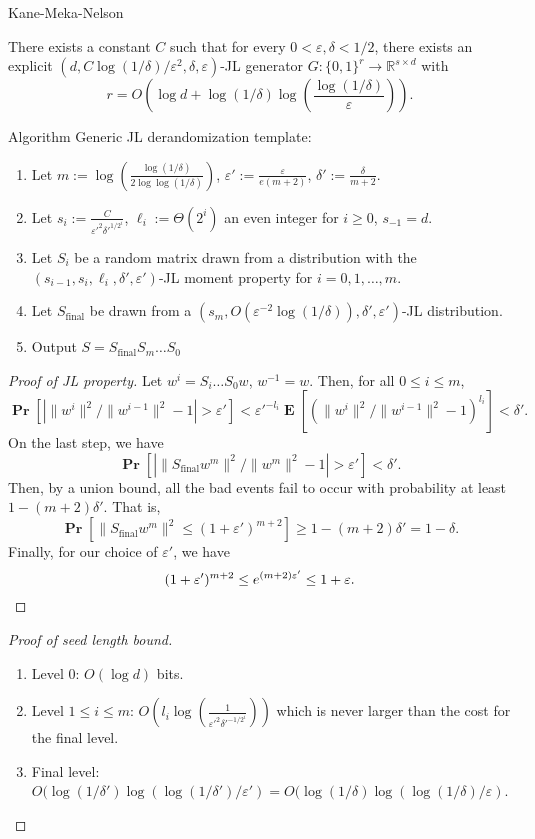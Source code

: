 \documentclass[10pt]{beamer}
\newcommand{\R}{\mathbb{R}}
\renewcommand{\P}{\operatorname*{\mathbf{Pr}}}
\newcommand{\E}{\operatorname*{\mathbf{E}}}
\renewcommand{\l}{\left}
\renewcommand{\r}{\right}
\newcommand{\eps}{\varepsilon}
\renewcommand{\d}{\displaystyle}
\begin{document}
\begin{frame}[allowframebreaks]{Kane-Meka-Nelson}
  \begin{theorem}
    \label{thm:main}
    There exists a constant $C$ such that for every
    $0<\eps,\delta<1/2$, there exists an explicit
    $(d,C\log(1/\delta)/\eps^2,\delta,\eps)$-JL generator
    $G:\{0,1\}^r\to \R^{s\times d}$ with
    \[
    r=O \l(\log d + \log(1/\delta)\log
    \l(\frac{\log(1/\delta)}{\eps}\r)\r).
    \]
  \end{theorem}

  \begin{block}{Algorithm}
    Generic JL derandomization template:
    \begin{enumerate}
    \item Let $m:=\d\log
      \l(\frac{\log(1/\delta)}{2\log\log(1/\delta)}\r)$,
      $\eps':=\d\frac{\eps}{e(m+2)}$, $\delta':=\d\frac{\delta}{m+2}$.
    \item Let $s_i:=\d\frac{C}{\eps'^2\delta'^{1/2^i}}$,
      $\ell_i:=\Theta(2^i)$ an even integer for $i\geq0$, $s_{-1}=d$.
    \item Let $S_i$ be a random matrix drawn from a distribution with
      the $(s_{i-1},s_i,\ell_i,\delta',\eps')$-JL moment property for
      $i=0,1,\ldots,m$.
    \item Let $S_{\text{final}}$ be drawn from a $\l(s_m, O
      \l(\eps^{-2}\log(1/\delta)\r),\delta',\eps'\r)$-JL distribution.
    \item Output $S=S_{\text{final}}S_m\ldots S_0$
    \end{enumerate}
  \end{block}

  \begin{proof}[Proof of JL property]
    Let $w^i=S_i\ldots S_0w$, $w^{-1}=w$. Then, for all $0\leq i \leq
    m$,
    \[
    \P\l[| \|w^i\|^2/\|w^{i-1}\|^2-1|>\eps'\r] <
    \eps'^{-l_i}\E\l[(\|w^i\|^2/\|w^{i-1}\|^2-1)^{l_i}\r]<\delta'.
    \]
    On the last step, we have
    \[
    \P\l[|\|S_{\text{final}}w^m\|^2/\|w^m\|^2-1| > \eps'\r]<\delta'.
    \]
    Then, by a union bound, all the bad events fail to occur with
    probability at least $1-(m+2)\delta'$. That is,
    \[
    \P\l[\|S_{\text{final}}w^m\|^2 \leq (1+\eps')^{m+2}\r] \geq 1-
    (m+2)\delta'=1-\delta.
    \]
    Finally, for our choice of $\eps'$, we have
    \[
    (1+\eps')^{m+2}\leq e^{(m+2)\eps'}\leq 1+\eps. \qedhere
    \]
  \end{proof}

  \begin{proof}[Proof of seed length bound]
    \begin{enumerate}
    \item Level $0$: $O(\log d)$ bits.
    \item Level $1\leq i \leq m$: $O(l_i\log
      \l(\frac{1}{\eps'^2\delta'^{-1/2^i}}\r))$ which is never
      larger than the cost for the final level.
    \item Final level: $O(\log(1/\delta')\log(\log(1/\delta')/\eps')
      = O(\log(1/\delta)\log(\log(1/\delta)/\eps)$.
    \end{enumerate}


\end{proof}
\end{frame}
\end{document}
